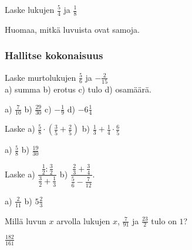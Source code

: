 \begin{tehtavasivu}
\begin{tehtava}
Laske lukujen $\frac{5}{4}$ ja $\frac{1}{8}$ 
	\begin{alakohdat}
	\end{alakohdat}
Huomaa, mitkä luvuista ovat samoja.
	\begin{vastaus}
		\begin{alakohdat}
			\alakohta{$\frac{-11}{8}$}
			\alakohta{$8\frac{5}{4}=10$}
			\alakohta{$-\frac{11}{8}$}
			\alakohta{$-\frac{8}{11}$}
		\end{alakohdat}
		
	\end{vastaus}
\end{tehtava}

\subsubsection*{Hallitse kokonaisuus}

\begin{tehtava}
Laske murtolukujen $\frac{5}{6}$ ja $-\frac{2}{15}$ \\ a) summa \qquad b) erotus \qquad c) tulo \qquad d) osamäärä.
\begin{vastaus}
a) $\frac{7}{10}$ \qquad b) $\frac{29}{30}$ \qquad c) $-\frac{1}{9}$ \qquad d) $-6\frac{1}{4}$
\end{vastaus}
\end{tehtava}

\begin{tehtava} Laske
a) $\frac{5}{8}\cdot(\frac{3}{5}+\frac{2}{5})$ \qquad b) $\frac{1}{3}+\frac{1}{4}\cdot\frac{6}{5}$
\begin{vastaus}
a) $\frac{5}{8}$ \qquad b) $\frac{19}{30}$
\end{vastaus}
\end{tehtava}

\begin{tehtava}Laske
a) $\dfrac{\frac{1}{2}:\frac{3}{2}}{\frac{3}{2}+\frac{1}{3}}$ \qquad b) $\dfrac{\frac{2}{3}+\frac{3}{4}}{\frac{5}{6}-\frac{7}{12}}$.
\begin{vastaus}
a) $\frac{2}{11}$ \qquad b) $5\frac{2}{3}$
\end{vastaus}
\end{tehtava}

\begin{tehtava}
Millä luvun $x$ arvolla lukujen $x$, $\frac{7}{91}$ ja $\frac{23}{2}$ tulo on $1$?
\begin{vastaus}
$\frac{182}{161}$
\end{vastaus}
\end{tehtava}


\end{tehtavasivu}
